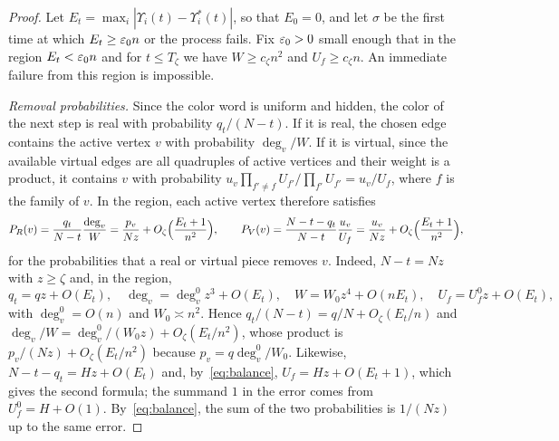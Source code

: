 \begin{proof} Let $E_t=\max_i|\Upsilon_i(t)-\Upsilon_i^*(t)|$, so that $E_0=0$, and let $\sigma$ be the
first time at which
$E_t\ge\varepsilon_0n$ or the process fails. Fix $\varepsilon_0>0$ small enough that in the region $E_t<\varepsilon_0 n$ and for
$t\le T_\zeta$ we have
$W\ge c_\zeta n^2$ and $U_f\ge c_\zeta n$. An immediate failure from this region is impossible.

\emph{Removal probabilities.} Since the color word is uniform and hidden, the color of the next step is real
with probability
$q_t/(N-t)$. If it is real, the chosen edge contains the active vertex $v$ with probability $\deg_v/W$. If
it is virtual, since the
available virtual edges are all quadruples of active vertices and their weight is a product, it contains $v$
with probability
$u_v\prod_{f'\ne f}U_{f'}\big/\prod_{f'}U_{f'}=u_v/U_f$, where $f$ is the family of $v$. In the region, each
active vertex therefore
satisfies \begin{equation}\label{eq:tasas}
 P_R(v)=\frac{q_t}{N-t}\frac{\deg_v}{W}=\frac{p_v}{Nz}+O_\zeta\Bigl(\frac{E_t+1}{n^2}\Bigr),\qquad
 P_V(v)=\frac{N-t-q_t}{N-t}\frac{u_v}{U_f}=\frac{u_v}{Nz}+O_\zeta\Bigl(\frac{E_t+1}{n^2}\Bigr),
\end{equation} for the probabilities that a real or virtual piece removes $v$. Indeed, $N-t=Nz$ with
$z\ge\zeta$ and, in the
region, \[
 q_t=qz+O(E_t),\quad \deg_v=\deg_v^0z^3+O(E_t),\quad W=W_0z^4+O(nE_t),\quad U_f=U_f^0z+O(E_t),
\] with $\deg_v^0=O(n)$ and $W_0\asymp n^2$. Hence $q_t/(N-t)=q/N+O_\zeta(E_t/n)$ and
$\deg_v/W=\deg_v^0/(W_0z)+O_\zeta(E_t/n^2)$,
whose product is $p_v/(Nz)+O_\zeta(E_t/n^2)$ because $p_v=q\deg_v^0/W_0$. Likewise, $N-t-q_t=Hz+O(E_t)$ and,
by~\eqref{eq:balance}, $U_f=Hz+O(E_t+1)$, which gives the second formula; the summand $1$ in the error comes
from
$U_f^0=H+O(1)$. By~\eqref{eq:balance}, the sum of the two probabilities is $1/(Nz)$ up to the same error.


\end{proof}
